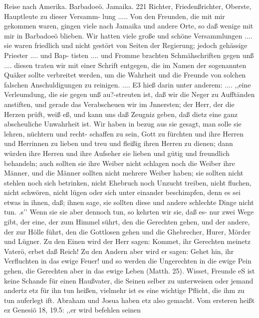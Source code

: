 Reise nach Amerika. Barbadoeö. Jamaika. 221
Richter, Friedenßrichter, Oberste, Hauptleute zu dieser Versamm-
lung ..... Von den Freunden, die mit mir gekommen waren,
gingen viele nach Jamaika und andere Orte, so daß wenige mit
mir in Barbadoeö blieben. Wir hatten viele große und schöne
Versammlungen .... sie waren friedlich und nicht gestört von
Seiten der Regierung; jedoch gehässige Priester .... und Bap-
tisten .... und Fromme brachten Schmähschriften gegen unß ....
diesen traten wir mit einer Schrift entgegen, die im Namen der
sogenannten Quäker sollte verbreitet werden, um die Wahrheit
und die Freunde von solchen falschen Anschuldigungen zu reinigen.
.... E3 hieß darin unter anderem: .... ,,eine Verleumdung,
die sie gegen unß au?-streuten ist, daß wir die Neger zu Aufftänden
anstiften, und gerade das Verabscheuen wir im Jnnersten; der
Herr, der die Herzen prüft, weiß eß, und kann uns daß Zeugniz
geben, daß dietz eine ganz abscheuliche Unwahrheit ist.  Wir haben
in bezug aus sie gesagt, man solle sie lehren, nüchtern und recht-
schaffen zu sein, Gott zu fürchten und ihre Herren und Herrinnen
zu lieben und treu und fleißig ihren Herren zu dienen; dann
würden ihre Herren und ihre Aufseher sie lieben und gütig und
freundlich behandeln; auch sollten sie ihre Weiber nicht schlagen
noch die Weiber ihre Männer, und die Männer sollten nicht
mehrere Weiber haben; sie sollten nicht stehlen noch sich betrinken,
nicht Ehebruch noch Unzucht treiben, nicht fluchen, nicht schwören,
nicht lügen oder sich unter einander beschimpfen, denn es sei
etwas in ihnen, daß; ihnen sage, sie sollten diese und andere
schlechte Dinge nicht tun. .s’’ Wenn sie sie aber dennoch tun, so
kehrten wir sie, daß es- nur zwei Wege gibt, der eine, der zum
Himmel sührt, den die Gerechten gehen, und der andere, der
zur Hölle führt, den die Gottlosen gehen und die Ghebrecher,
Hurer, Mörder und Lügner. Zu den Einen wird der Herr sagen:
Kommet, ihr Gerechten meinetz Vaterö, erbet daß Reich! Zu
den Andern aber wird er sagen: Gehet hin, ihr Verfluchten in
das ewige Feuer! und so werden die Ungerechten in die ewige
Pein gehen, die Gerechten aber in das ewige Leben (Matth. 25).
Wisset, Freunde eS ist keine Schande für einen Haußvater,
die Seinen selber zu unterweisen oder jemand andertz etz für ihn
tun heißen, vielmehr ist es eine wichtige Pflicht, die ihm zu
tun auferlegt ift. Abraham und Josua haben etz also gemacht.
Vom ersteren heißt ez Genesiö 18, 19.5: ,,er wird befehlen seinen


